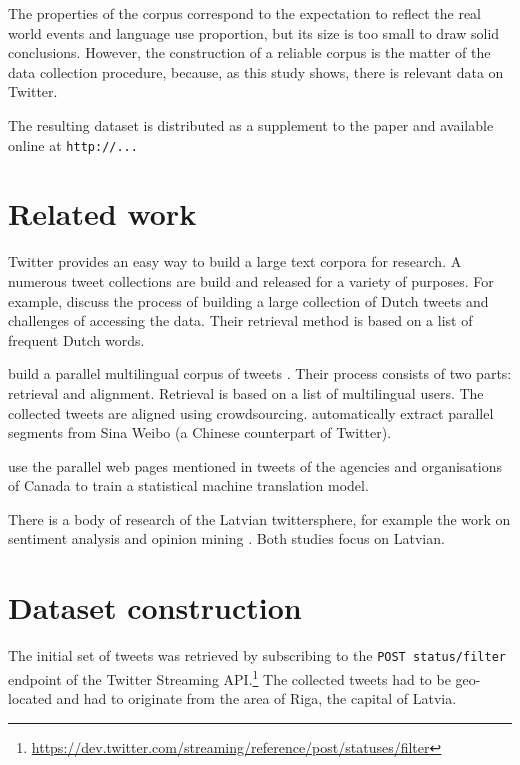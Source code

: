 \documentclass[11pt,a4paper]{article}
\begin{document}
The properties of the corpus correspond to the expectation to reflect the real world events and language use proportion, but its size is too small to draw solid conclusions. However, the construction of a reliable corpus is the matter of the data collection procedure, because, as this study shows, there is relevant data on Twitter.

The resulting dataset is distributed as a supplement to the paper and available online at \texttt{http://...}

\section{Related work}

Twitter provides an easy way to build a large text corpora for research. A numerous tweet collections are build and released for a variety of purposes. For example, \citet{sang2013} discuss the process of building a large collection of Dutch tweets and challenges of accessing the data. Their retrieval method is based on a list of frequent Dutch words.

\citet{SANVICENTE16.465} build a parallel multilingual corpus of tweets%
. Their process consists of two parts: retrieval and alignment. Retrieval is based on a list of multilingual users. The collected tweets are aligned using crowdsourcing. \citet{ling-EtAl:2013:ACL2013} automatically extract parallel segments from Sina Weibo (a Chinese counterpart of Twitter). 

\citet{gotti-langlais-farzindar:2013:LASM} use the parallel web pages mentioned in tweets of the agencies and organisations of Canada to train a statistical machine translation model.

There is a body of research of the Latvian twittersphere, for example the work on sentiment analysis \cite{Peisenieks2014} and opinion mining \cite{vspats2016opinion}. Both studies focus on Latvian.




\section{Dataset construction}
\label{sec:construction}

The initial set of tweets was retrieved by subscribing to the \texttt{POST status/filter} endpoint of the Twitter Streaming API.\footnote{\url{https://dev.twitter.com/streaming/reference/post/statuses/filter}}
The collected tweets had to be geo-located and had to originate from the area of Riga, the capital of Latvia.\footnotemark{}
\end{document}
